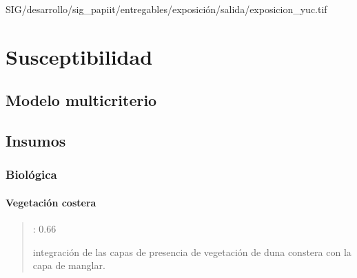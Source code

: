 \documentclass[letterpaper,10pt,spanish]{sphinxmanual}
\begin{document}
 SIG/desarrollo/sig\_papiit/entregables/exposición/salida/exposicion\_yuc.tif


\chapter{Susceptibilidad}
\label{\detokenize{sensibilidad:susceptibilidad}}\label{\detokenize{sensibilidad::doc}}

\section{Modelo multicriterio}
\label{\detokenize{sensibilidad:modelo-multicriterio}}


\section{Insumos}
\label{\detokenize{sensibilidad:insumos}}

\subsection{Biológica}
\label{\detokenize{sensibilidad:biologica}}

\subsubsection{Vegetación costera}
\label{\detokenize{sensibilidad:vegetacion-costera}}\begin{quote}


 : 0.66

 integración de las capas de presencia de vegetación de duna constera con la capa de manglar.
\end{quote}
\end{document}
